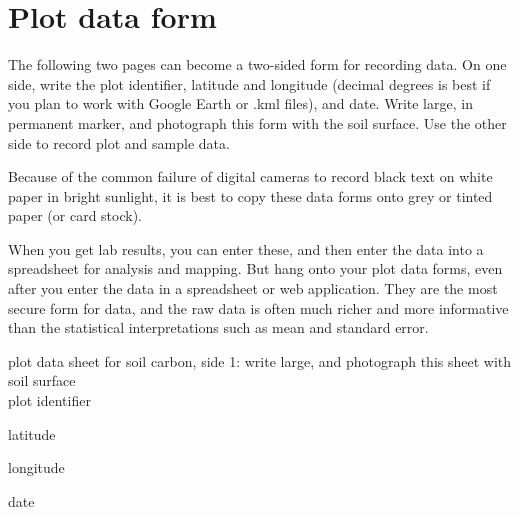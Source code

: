 \documentclass[11pt,letterpaper,oneside,onecolumn]{memoir}
\begin{document}
\section{Plot data form}

The following two pages can become a two-sided form for recording data. On one side, write the plot identifier, latitude and longitude (decimal degrees is best if you plan to work with Google Earth or .kml files), and date. Write large, in permanent marker, and photograph this form with the soil surface. Use the other side to record plot and sample data.

Because of the common failure of digital cameras to record black text on white paper in bright sunlight, it is best to copy these data forms onto grey or tinted paper (or card stock).

When you get lab results, you can enter these, and then enter the data into a spreadsheet for analysis and mapping. But hang onto your plot data forms, even after you enter the data in a spreadsheet or web application. They are the most secure form for data, and the raw data is often much richer and more informative than the statistical interpretations such as mean and standard error.

\clearpage
\footnotesize
\noindent plot data sheet for soil carbon, side 1: write large, and photograph this sheet with soil surface\\ 
\HUGE
\noindent plot identifier

\vspace{6em}

\noindent latitude

\vspace{6em}

\noindent longitude

\vspace{6em}

\noindent date
\normalsize
\end{document}
